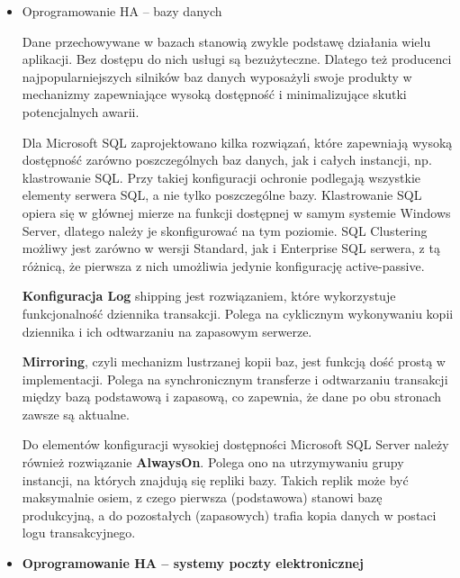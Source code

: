 \documentclass[12pt]{article}
\renewcommand{\_}{\kern-1.5pt\textunderscore\kern-1.5pt}
\begin{document}
\begin{itemize}
	\item Oprogramowanie HA – bazy danych\par

Dane przechowywane w bazach stanowią zwykle podstawę działania wielu aplikacji. Bez dostępu do nich usługi są bezużyteczne. Dlatego też producenci najpopularniejszych silników baz danych wyposażyli swoje produkty w mechanizmy zapewniające wysoką dostępność i minimalizujące skutki potencjalnych awarii.\par

Dla Microsoft SQL zaprojektowano kilka rozwiązań, które zapewniają wysoką dostępność zarówno poszczególnych baz danych, jak i całych instancji, np. klastrowanie SQL. Przy takiej konfiguracji ochronie podlegają wszystkie elementy serwera SQL, a nie tylko poszczególne bazy. Klastrowanie SQL opiera się w głównej mierze na funkcji dostępnej w samym systemie Windows Server, dlatego należy je skonfigurować na tym poziomie. SQL Clustering możliwy jest zarówno w wersji Standard, jak i Enterprise SQL serwera, z tą różnicą, że pierwsza z nich umożliwia jedynie konfigurację active-passive.\par

\textbf{Konfiguracja Log} shipping jest rozwiązaniem, które wykorzystuje funkcjonalność dziennika transakcji. Polega na cyklicznym wykonywaniu kopii dziennika i ich odtwarzaniu na zapasowym serwerze.\par


\vspace{\baselineskip}
\textbf{Mirroring}, czyli mechanizm lustrzanej kopii baz, jest funkcją dość prostą w implementacji. Polega na synchronicznym transferze i odtwarzaniu transakcji między bazą podstawową i zapasową, co zapewnia, że dane po obu stronach zawsze są aktualne.\par


\vspace{\baselineskip}
Do elementów konfiguracji wysokiej dostępności Microsoft SQL Server należy również rozwiązanie \textbf{AlwaysOn}. Polega ono na utrzymywaniu grupy instancji, na których znajdują się repliki bazy. Takich replik może być maksymalnie osiem, z czego pierwsza (podstawowa) stanowi bazę produkcyjną, a do pozostałych (zapasowych) trafia kopia danych w postaci logu transakcyjnego.\par


\vspace{\baselineskip}
	\item \textbf{Oprogramowanie HA – systemy poczty elektronicznej}\par


\end{itemize}
\end{document}
